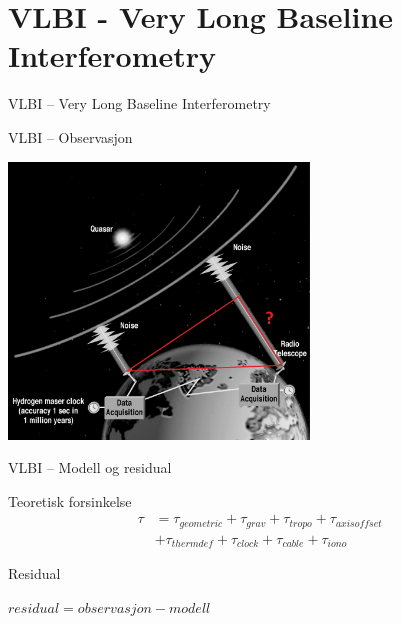 \documentclass[12pt,table,t]{beamer}
\begin{document}
\section{VLBI - Very Long Baseline Interferometry}

\begin{frame}[c]{}
  \begin{center}
    {\Huge VLBI -- Very Long Baseline Interferometry}
  \end{center}
\end{frame}


\begin{frame}{VLBI -- Observasjon}
  \begin{center}
    \includegraphics[width=0.6\textwidth]{figure/vlbi_concept}
  \end{center}
\end{frame}


\begin{frame}{VLBI -- Modell og residual}
  \Large
  \begin{block}{Teoretisk forsinkelse}
    \vspace*{-0.7cm}
    \begin{align*}
      \tau &= \tau_{geometric} + \tau_{grav} + \tau_{tropo} + \tau_{axisoffset} \\
           &+ \tau_{thermdef} + \tau_{clock} + \tau_{cable} + \tau_{iono}
    \end{align*}
  \end{block}

  \begin{block}{Residual}
    \begin{center}
      $residual = observasjon - modell$
    \end{center}
  \end{block}
\end{frame}
\end{document}
